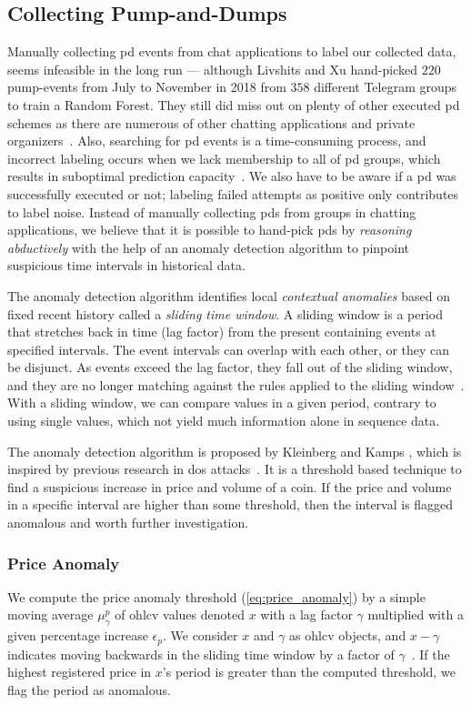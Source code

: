 \subsection{Collecting Pump-and-Dumps}
Manually collecting \ac{pd} events from chat applications to label our collected data, seems infeasible in the long run — although Livshits and Xu \cite{P&D_anatomy} hand-picked $220$ pump-events from July to November in 2018 from $358$ different Telegram groups to train a Random Forest. They still did miss out on plenty of other executed \ac{pd} schemes as there are numerous of other chatting applications and private organizers~\cite{blockonomi}. Also, searching for \ac{pd} events is a time-consuming process, and incorrect labeling occurs when we lack membership to all of \ac{pd} groups, which results in suboptimal prediction capacity~\cite{label_noise}. We also have to be aware if a \ac{pd} was successfully executed or not; labeling failed attempts as positive only contributes to label noise. Instead of manually collecting \acp{pd} from groups in chatting applications, we believe that it is possible to hand-pick \acp{pd} by \emph{reasoning abductively} with the help of an anomaly detection algorithm to pinpoint suspicious time intervals in historical data.

The anomaly detection algorithm identifies local \emph{contextual anomalies} based on fixed recent history called a \emph{sliding time window}. A sliding window is a period that stretches back in time (lag factor) from the present containing events at specified intervals. The event intervals can overlap with each other, or they can be disjunct. As events exceed the lag factor, they fall out of the sliding window, and they are no longer matching against the rules applied to the sliding window~\cite{redhat}. With a sliding window, we can compare values in a given period, contrary to using single values, which not yield much information alone in sequence data.

The anomaly detection algorithm is proposed by Kleinberg and Kamps \cite{P&D_to_the_moon}, which is inspired by previous research in \ac{dos} attacks~\cite{dos}. It is a threshold based technique to find a suspicious increase in price and volume of a coin. If the price and volume in a specific interval are higher than some threshold, then the interval is flagged anomalous and worth further investigation.

\subsubsection{Price Anomaly}
We compute the price anomaly threshold (\autoref{eq:price_anomaly}) by a simple moving average $\mu_\gamma^p$ of \ac{ohlcv} values denoted $x$ with a lag factor $\gamma$ multiplied with a given percentage increase $\epsilon_p$. We consider $x$ and $\gamma$ as \ac{ohlcv} objects, and $x-\gamma$ indicates moving backwards in the sliding time window by a factor of $\gamma$~\cite{P&D_to_the_moon}. If the highest registered price in $x$'s period is greater than the computed threshold, we flag the period as anomalous.


